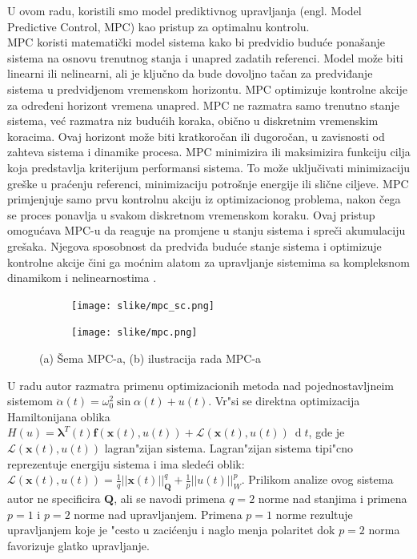 \documentclass[a4paper,11pt]{article}
\theoremstyle{definition} \newtheorem{deff}{Definicija}[section]
\theoremstyle{definition} \newtheorem{prim}[deff]{Primer}
\theoremstyle{plain} \newtheorem{teor}[deff]{Teorema}
\newcommand{\vect}[1]{\boldsymbol{\mathbf{#1}}}
\begin{document}
	U ovom radu, koristili smo model prediktivnog upravljanja (engl. Model Predictive Control, MPC) kao pristup za optimalnu kontrolu. \\
	
	MPC koristi matematički model sistema kako bi predvidio buduće ponašanje sistema na osnovu trenutnog stanja i unapred zadatih referenci. Model može biti linearni ili nelinearni, ali je ključno da bude dovoljno tačan za predviđanje sistema u predvidjenom vremenskom horizontu. MPC optimizuje kontrolne akcije za određeni horizont vremena unapred. MPC ne razmatra samo trenutno stanje sistema, već razmatra niz budućih koraka, obično u diskretnim vremenskim koracima. Ovaj horizont može biti kratkoročan ili dugoročan, u zavisnosti od zahteva sistema i dinamike procesa. MPC minimizira ili maksimizira funkciju cilja koja predstavlja kriterijum performansi sistema. To može uključivati minimizaciju greške u praćenju referenci, minimizaciju potrošnje energije ili slične ciljeve. MPC primjenjuje samo prvu kontrolnu akciju iz optimizacionog problema, nakon čega se proces ponavlja u svakom diskretnom vremenskom koraku. Ovaj pristup omogućava MPC-u da reaguje na promjene u stanju sistema i spreči akumulaciju grešaka. Njegova sposobnost da predviđa buduće stanje sistema i optimizuje kontrolne akcije čini ga moćnim alatom za upravljanje sistemima sa kompleksnom dinamikom i nelinearnostima \cite{mpc}.\\
	
	
	\begin{figure}[!htb]
		\centering
		\begin{subfigure}{0.5\linewidth}
			\centering
			\texttt{[image: slike/mpc\_sc.png]}
			\caption{}
			\label{fig:mpc_sc}
		\end{subfigure}
		\hfill
		\begin{subfigure}{0.48\linewidth}
			\centering
			\texttt{[image: slike/mpc.png]}
			\caption{}
			\label{fig:mpc_f}
		\end{subfigure}
		\caption{(a) Šema MPC-a, (b) ilustracija rada MPC-a \cite{mpc} }
	\end{figure}
	
	
	U radu \cite{inicijalna} autor razmatra primenu optimizacionih metoda nad pojednostavljneim sistemom $\ddot{\alpha}(t) = \omega_0^2 \operatorname{sin}\alpha(t) + u(t)$. Vr"si se direktna optimizacija Hamiltonijana oblika $H(u) = \vect{\lambda}^T(t)\vect{f}(\mathbf{x}(t), u(t)) + \mathcal{L}(\mathbf{x}(t), u(t))~\operatorname{d}t$, gde je $\mathcal{L}(\mathbf{x}(t), u(t))$ lagran"zijan sistema. Lagran"zijan sistema tipi"cno reprezentuje energiju sistema i ima slede\'ci oblik: $\mathcal{L}(\mathbf{x}(t), u(t)) = \frac{1}{q}||\mathbf{x}(t)||_{\mathbf{Q}}^q + \frac{1}{p}||u(t)||_{W}^p$. Prilikom analize ovog sistema autor ne specificira $\mathbf{Q}$, ali se navodi primena $q=2$ norme nad stanjima i primena $p=1$ i $p=2$ norme nad upravljanjem. Primena $p=1$ norme rezultuje upravljanjem koje je "cesto u zaci\'cenju i naglo menja polaritet dok $p = 2$ norma favorizuje glatko upravljanje. \\
	
\end{document}

